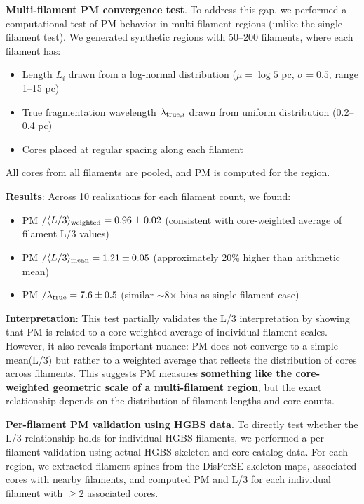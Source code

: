 \documentclass[twoside,twocolumn]{mnras}
\begin{document}
\textbf{Multi-filament PM convergence test}. To address this gap, we performed a computational test of PM behavior in multi-filament regions (unlike the single-filament test). We generated synthetic regions with 50--200 filaments, where each filament has:
\begin{itemize}
    \item Length $L_i$ drawn from a log-normal distribution ($\mu = \log 5$ pc, $\sigma = 0.5$, range 1--15 pc)
    \item True fragmentation wavelength $\lambda_{{\rm true},i}$ drawn from uniform distribution (0.2--0.4 pc)
    \item Cores placed at regular spacing along each filament
\end{itemize}
All cores from all filaments are pooled, and PM is computed for the region.

\textbf{Results}: Across 10 realizations for each filament count, we found:
\begin{itemize}
    \item PM $/ \langle L/3 \rangle_{\rm weighted} = 0.96 \pm 0.02$ (consistent with core-weighted average of filament L/3 values)
    \item PM $/ \langle L/3 \rangle_{\rm mean} = 1.21 \pm 0.05$ (approximately 20\% higher than arithmetic mean)
    \item PM $/ \lambda_{\rm true} = 7.6 \pm 0.5$ (similar $\sim$8$\times$ bias as single-filament case)
\end{itemize}

\textbf{Interpretation}: This test partially validates the L/3 interpretation by showing that PM is related to a core-weighted average of individual filament scales. However, it also reveals important nuance: PM does not converge to a simple mean(L/3) but rather to a weighted average that reflects the distribution of cores across filaments. This suggests PM measures \textbf{something like the core-weighted geometric scale of a multi-filament region}, but the exact relationship depends on the distribution of filament lengths and core counts.

\textbf{Per-filament PM validation using HGBS data}. To directly test whether the L/3 relationship holds for individual HGBS filaments, we performed a per-filament validation using actual HGBS skeleton and core catalog data. For each region, we extracted filament spines from the DisPerSE skeleton maps, associated cores with nearby filaments, and computed PM and L/3 for each individual filament with $\ge 2$ associated cores.
\end{document}
